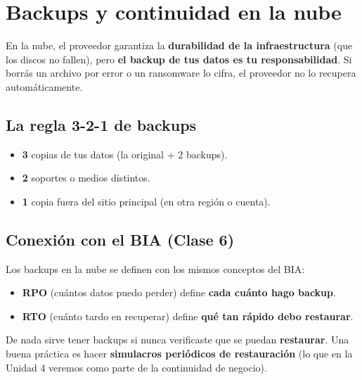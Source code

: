 \documentclass[12pt,a4paper]{article}
\begin{document}
\newpage
\section{Backups y continuidad en la nube}

\begin{cajaDefinicion}
En la nube, el proveedor garantiza la \textbf{durabilidad de la infraestructura} (que los discos no fallen), pero \textbf{el backup de tus datos es tu responsabilidad}. Si borr\'as un archivo por error o un ransomware lo cifra, el proveedor no lo recupera autom\'aticamente.
\end{cajaDefinicion}

\subsection{La regla 3-2-1 de backups}
\begin{cajaConcepto}[title={Regla 3-2-1}]
\begin{itemize}[leftmargin=2em]
    \item \textbf{3} copias de tus datos (la original + 2 backups).
    \item \textbf{2} soportes o medios distintos.
    \item \textbf{1} copia fuera del sitio principal (en otra regi\'on o cuenta).
\end{itemize}
\end{cajaConcepto}

\subsection{Conexi\'on con el BIA (Clase 6)}
Los backups en la nube se definen con los mismos conceptos del BIA:
\begin{itemize}[leftmargin=2em]
    \item \textbf{RPO} (cu\'antos datos puedo perder) define \textbf{cada cu\'anto hago backup}.
    \item \textbf{RTO} (cu\'anto tardo en recuperar) define \textbf{qu\'e tan r\'apido debo restaurar}.
\end{itemize}

\begin{cajaNota}[title={Ojo: un backup que no se prueba, no es un backup}]
De nada sirve tener backups si nunca verificaste que se puedan \textbf{restaurar}. Una buena pr\'actica es hacer \textbf{simulacros peri\'odicos de restauraci\'on} (lo que en la Unidad 4 veremos como parte de la continuidad de negocio).
\end{cajaNota}
\end{document}
